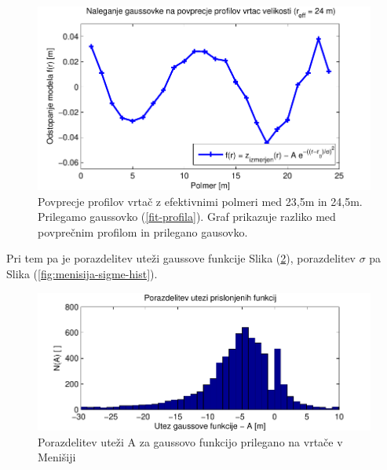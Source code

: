 \documentclass[a4paper, oneside, 12pt]{book}
\begin{document}
  \begin{figure}[H]
    \centering
    \includegraphics{slike/menisija-profil-21-fit}
    \caption{Povprecje profilov vrtač z efektivnimi polmeri med 23,5m in 24,5m. Prilegamo gaussovko (\ref{fit-profila}). Graf prikazuje razliko med povprečnim profilom in prilegano gausovko.}
    \label{fig:menisija-profil-21-fit}
  \end{figure}

  Pri tem pa je porazdelitev uteži gaussove funkcije Slika (\ref{fig:menisija-globine-hist}), porazdelitev $\sigma$ pa Slika (\ref{fig:menisija-sigme-hist}).

  \begin{figure}[H]
    \begin{center}
      \includegraphics{slike/menisija-globine-hist}
    \end{center}
    \caption{Porazdelitev uteži A za gaussovo funkcijo prilegano na vrtače v Menišiji}
    \label{fig:menisija-globine-hist}
  \end{figure}
\end{document}
